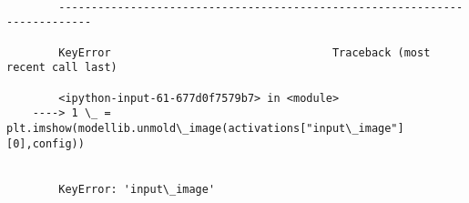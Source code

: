 \documentclass[11pt]{article}
\begin{document}
    \begin{Verbatim}[commandchars=\\\{\}]

        ---------------------------------------------------------------------------

        KeyError                                  Traceback (most recent call last)

        <ipython-input-61-677d0f7579b7> in <module>
    ----> 1 \_ = plt.imshow(modellib.unmold\_image(activations["input\_image"][0],config))
    

        KeyError: 'input\_image'

    \end{Verbatim}


    
    
    
    
\end{document}
